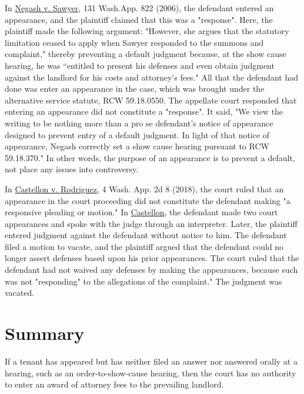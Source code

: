 \documentclass[11pt]{article}
\begin{document}
In \uline{Negash v. Sawyer}, 131 Wash.App. 822 (2006), the defendant entered an appearance, and the plaintiff claimed that this was a "response".  Here, the plaintiff made the following argument:
"However, she argues that the statutory limitation ceased to apply when Sawyer responded to the summons and complaint," thereby preventing a default judgment
because, at the show cause hearing, he was “entitled to present his defenses and even obtain judgment against the landlord for his costs and attorney’s fees."
All that the defendant had done was enter an appearance in the case, which was brought under the alternative service statute, RCW 59.18.0550.
The appellate court responded that entering an appearance did not constitute a "response".  It said,
"We view the writing to be nothing more than a pro se defendant’s notice of appearance designed to prevent entry of a default judgment.
In light of that notice of appearance, Negash correctly set a show cause hearing pursuant to RCW 59.18.370."  In other words, the purpose of an appearance is to prevent
a default, not place any issues into controversy.

In \uline{Castellon v. Rodriguez}, 4 Wash. App. 2d 8 (2018), the court ruled that an appearance in the court proceeding did not constitute the defendant making "a responsive pleading
or motion."  In \uline{Castellon}, the defendant made two court appearances and spoke with the judge through an interpreter.  Later, the plaintiff entered judgment against the defendant
without notice to him.  The defendant filed a motion to vacate, and the plaintiff argued that the defendant could no longer assert defenses based upon his prior appearances.  The court
ruled that the defendant had not waived any defenses by making the appearances, because such was not "responding" to the allegations of the complaint."  The judgment was
vacated.

\section{Summary}
\label{sec:orgff47fe0}

If a tenant has appeared but has neither filed an answer nor answered orally at a hearing, such as an order-to-show-cause hearing, then the court has no authority to enter an award of
attorney fees to the prevailing landlord.
\end{document}
